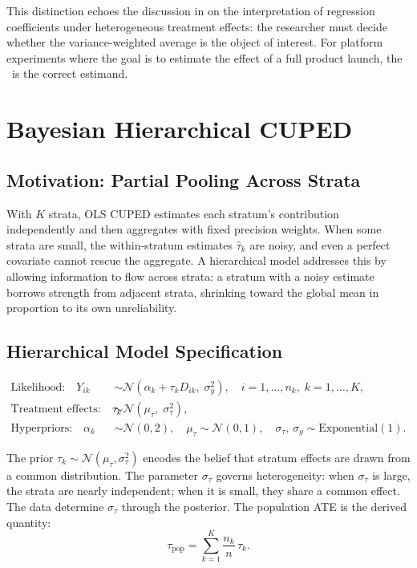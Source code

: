 \documentclass[12pt]{article}
\theoremstyle{plain}
\theoremstyle{definition}
\newcommand{\PATE}{\text{PATE}}
\begin{document}
This distinction echoes the discussion in \citet[pp.~80--82]{angrist2009mostly}
on the interpretation of regression coefficients under heterogeneous
treatment effects: the researcher must decide whether the variance-weighted
average is the object of interest.
For platform experiments where the goal is to estimate the effect of
a full product launch, the \PATE\ is the correct estimand.

\section{Bayesian Hierarchical CUPED}
\label{sec:bayesian}

\subsection{Motivation: Partial Pooling Across Strata}

With $K$ strata, OLS CUPED estimates each stratum's contribution
independently and then aggregates with fixed precision weights.
When some strata are small, the within-stratum estimates $\hat{\tau}_k$
are noisy, and even a perfect covariate cannot rescue the aggregate.
A hierarchical model addresses this by allowing information to flow across
strata: a stratum with a noisy estimate borrows strength from adjacent
strata, shrinking toward the global mean in proportion to its own
unreliability.

\subsection{Hierarchical Model Specification}

\begin{align}
  \text{Likelihood:} \quad
    Y_{ik} &\sim \mathcal{N}(\alpha_k + \tau_k D_{ik},\; \sigma_y^2),
    \quad i = 1,\dots,n_k,\; k = 1,\dots,K,
    \label{eq:likelihood} \\
  \text{Treatment effects:} \quad
    \tau_k &\sim \mathcal{N}(\mu_\tau,\; \sigma_\tau^2),
    \label{eq:prior_tau} \\
  \text{Hyperpriors:} \quad
    \alpha_k &\sim \mathcal{N}(0, 2), \quad
    \mu_\tau \sim \mathcal{N}(0, 1), \quad
    \sigma_\tau,\, \sigma_y \sim \mathrm{Exponential}(1).
    \label{eq:hyperpriors}
\end{align}

The prior $\tau_k \sim \mathcal{N}(\mu_\tau, \sigma_\tau^2)$ encodes the
belief that stratum effects are drawn from a common distribution.
The parameter $\sigma_\tau$ governs heterogeneity: when $\sigma_\tau$ is
large, the strata are nearly independent; when it is small, they share a
common effect.
The data determine $\sigma_\tau$ through the posterior.
The population ATE is the derived quantity:
\begin{equation}
  \tau_{\mathrm{pop}} = \sum_{k=1}^K \frac{n_k}{n}\,\tau_k.
  \label{eq:pop_ate}
\end{equation}
\end{document}
